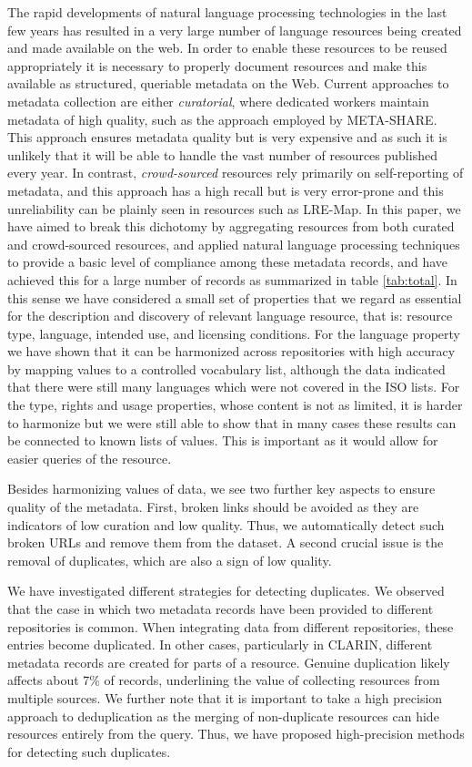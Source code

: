 \documentclass[11pt]{article}
\begin{document}
The rapid developments of natural language processing technologies in the last
few years has resulted in a very large number of language resources being
created and made available on the web. In order to enable these resources to be
reused appropriately it is necessary to properly document resources and make
this available as structured, queriable metadata on the Web. Current approaches
to metadata collection are either \emph{curatorial}, where dedicated workers
maintain metadata of high quality, such as the approach employed by META-SHARE.
This approach ensures metadata quality but is very expensive and as such it is
unlikely that it will be able to handle the vast number of resources published
every year. In contrast, \emph{crowd-sourced} resources rely primarily on
self-reporting of metadata, and this approach has a high recall but is very
error-prone and this unreliability can be plainly seen in resources such as
LRE-Map. In this paper, we have aimed to break this dichotomy by aggregating
resources from both curated and crowd-sourced resources, and applied natural language
processing techniques to provide a basic level of compliance among these
metadata records, and have achieved this for a large number of records as
summarized in table \ref{tab:total}. In this sense we have considered a small
set of properties that we regard as essential for the description and discovery
of relevant language resource, that is: resource type, language, intended use,
and licensing conditions.  For the
language property we have shown that it can be harmonized across repositories
with high accuracy by mapping values to a controlled vocabulary list, although
the data indicated that there were still many languages which were not covered
in the ISO lists. For the type, rights and usage properties, whose content is
not as limited, it is harder to harmonize but we were still able to show that in
many cases these results can be connected to known lists of values. This is
important as it would allow for easier queries of the resource. 

Besides harmonizing values of data, we see two further key aspects to ensure
quality of the metadata.  First, broken links should be avoided as they are
indicators of low curation and low quality. Thus, we automatically detect such
broken URLs and remove them from the dataset. A second crucial issue is the
removal of duplicates, which are also a sign of low quality.

We have investigated different strategies for detecting duplicates. We observed
that the case in which two metadata records have been provided to different
repositories is common. When integrating data from different repositories, these
entries become duplicated. In other cases, particularly in CLARIN, different
metadata records are created for parts of a resource. Genuine duplication likely
affects about 7\% of records, underlining the value of collecting resources from
multiple sources. We further note that it is important to take a high precision
approach to deduplication as the merging of non-duplicate resources can hide
resources entirely from the query. Thus, we have proposed high-precision methods
for detecting such duplicates. 
\end{document}
